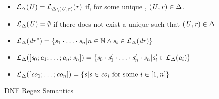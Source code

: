 \begin{figure}
%
%
%
%
\begin{itemize}
\item $\mathcal{L}_{\Delta}(\mathit{U})=\mathcal{L}_{\Delta\setminus(\mathit{U},\mathit{r})}(\mathit{r})$ if, for some unique \Regex{}, $(\mathit{U},\mathit{r})\in\Delta$.
\item $\mathcal{L}_{\Delta}(\mathit{U})=\emptyset$
if there does not exist a unique \Regex{} such that $(\mathit{U},\mathit{r})\in\Delta$
\item $\mathcal{L}_{\Delta}(\mathit{dr}^*) =
\{\mathit{s}_1\cdot\ldots\cdot\mathit{s}_n | n\in\mathbb{N} \wedge \mathit{s}_i\in\mathcal{L}_{\Delta}(\mathit{dr})\}$
\item $\mathcal{L}_{\Delta}([\mathit{s}_0;\mathit{a}_1;\ldots;\mathit{a}_n;\mathit{s}_n])=
\{\mathit{s}_0\cdot\mathit{s}_1'\cdot\ldots\cdot\mathit{s}_n'\cdot\mathit{s}_n | \mathit{s}_i'\in\mathcal{L}_{\Delta}(\mathit{a}_i)\}$
\item $\mathcal{L}_{\Delta}([\mathit{co}_1;\ldots;\mathit{co}_n])=
\{\mathit{s} | \mathit{s} \in \mathit{co}_i \text{ for some $i\in[1,n]$}\}$
\end{itemize}
\caption{DNF Regex Semantics}
\label{fig:dnf-regex-semantics}
\end{figure}
